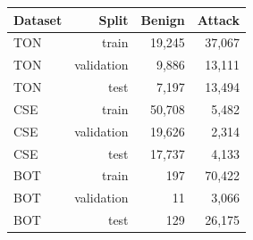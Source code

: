 \begin{tabular}{lrrr}
\toprule
Dataset & Split & Benign & Attack \\
\midrule
TON & train & 19,245 & 37,067 \\
TON & validation & 9,886 & 13,111 \\
TON & test & 7,197 & 13,494 \\
CSE & train & 50,708 & 5,482 \\
CSE & validation & 19,626 & 2,314 \\
CSE & test & 17,737 & 4,133 \\
BOT & train & 197 & 70,422 \\
BOT & validation & 11 & 3,066 \\
BOT & test & 129 & 26,175 \\
\bottomrule
\end{tabular}
